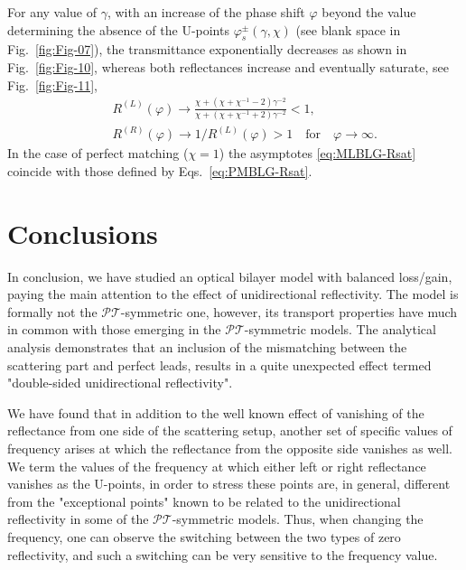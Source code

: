 \documentclass[aps,pra,reprint,showpacs,bibnotes,preprintnumbers,twoside,eqsecnum]{revtex4-1}
\begin{document}
For any value of $\gamma$, with an increase of the phase shift $\varphi$ beyond the value determining the absence of the U-points $\varphi^{\pm}_s(\gamma,\chi)$ (see blank space in Fig.~\ref{fig:Fig-07}), the transmittance exponentially decreases as shown in Fig.~\ref{fig:Fig-10}, whereas both reflectances increase and eventually saturate, see Fig.~\ref{fig:Fig-11},
%
\begin{eqnarray}\label{eq:MLBLG-Rsat}
&&R^{(L)}(\varphi)\to\frac{\chi+(\chi+\chi^{-1}-2)\gamma^{-2}}{\chi+(\chi+\chi^{-1}+2)\gamma^{-2}}<1,\nonumber\\
&&R^{(R)}(\varphi)\to1/R^{(L)}(\varphi)>1\quad\mathrm{for}\quad\varphi\to\infty.
\end{eqnarray}
In the case of perfect matching ($\chi=1$) the asymptotes \eqref{eq:MLBLG-Rsat} coincide with those defined by Eqs.~\eqref{eq:PMBLG-Rsat}.

\section{Conclusions}
In conclusion, we have studied an optical bilayer model with balanced loss/gain, paying the main attention to the effect of unidirectional reflectivity. The model is formally not the $\mathcal{P}\mathcal{T}$-symmetric one, however, its transport properties have much in common with those emerging in the $\mathcal{P}\mathcal{T}$-symmetric models. The analytical analysis demonstrates that an inclusion of the mismatching between the scattering part and perfect leads, results in a quite unexpected effect termed "double-sided unidirectional reflectivity".

We have found that in addition to the well known effect of vanishing of the reflectance from one side of the scattering setup, another set of specific values of frequency arises at which the reflectance from the opposite side vanishes as well. We term the values of the frequency at which either left or right reflectance vanishes as the U-points, in order to stress these points are, in general, different from the "exceptional points" known to be related to the unidirectional reflectivity in some of the $\mathcal{P}\mathcal{T}$-symmetric models. Thus, when changing the frequency, one can observe the switching between the two types of zero reflectivity, and such a switching can be very sensitive to the frequency value.
\end{document}
